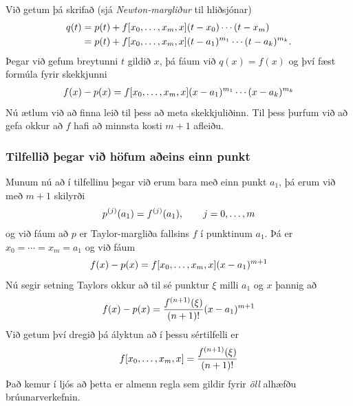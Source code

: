 \documentclass[a4paper,10pt,icelandic]{sphinxmanual}
\begin{document}
Við getum þá skrifað (sjá \emph{Newton-margliður} til hliðsjónar)
\begin{gather}
\begin{split}\begin{aligned}
  q(t) &= p(t) + f[x_0,\ldots,x_m,x](t-x_0)\cdots(t-x_m) \\
  &= p(t) + f[x_0,\ldots,x_m,x](t-a_1)^{m_1}\cdots(t-a_k)^{m_k}.\end{aligned}\end{split}\notag
\end{gather}
Þegar við gefum breytunni \(t\) gildið \(x\), þá fáum við
\(q(x) = f(x)\) og því fæst formúla fyrir skekkjunni
\begin{gather}
\begin{split}f(x) - p(x)
  = f[x_0,\ldots,x_m,x](x-a_1)^{m_1}\cdots(x-a_k)^{m_k}\end{split}\notag
\end{gather}
Nú ætlum við að finna leið til þess að meta skekkjuliðinn. Til þess
þurfum við að gefa okkur að \(f\) hafi að minnsta kosti \(m+1\)
afleiðu.


\subsubsection{Tilfellið þegar við höfum aðeins einn punkt}
\label{kafli03:tilfelli-egar-vi-hofum-aeins-einn-punkt}
Munum nú að í tilfellinu þegar við erum bara með einn punkt \(a_1\),
þá erum við með \(m+1\) skilyrði
\begin{gather}
\begin{split}p^{(j)}(a_1)=f^{(j)}(a_1), \qquad j=0,\dots,m\end{split}\notag
\end{gather}
og við fáum að \(p\) er Taylor-margliða fallsins \(f\) í
punktinum \(a_1\). Þá er \(x_0=\cdots=x_m=a_1\) og við fáum
\begin{gather}
\begin{split}f(x) - p(x)
  = f[x_0,\ldots,x_m,x](x-a_1)^{m+1}\end{split}\notag
\end{gather}
Nú segir setning Taylors okkur að til sé punktur \(\xi\) milli
\(a_1\) og \(x\) þannig að
\begin{gather}
\begin{split}f(x) - p(x)
  = \dfrac{f^{(n+1)}(\xi)}{(n+1)!}(x-a_1)^{m+1}\end{split}\notag
\end{gather}
Við getum því dregið þá ályktun að í þessu sértilfelli er
\begin{gather}
\begin{split}f[x_0,\ldots,x_m,x]=\dfrac{f^{(n+1)}(\xi)}{(n+1)!}\end{split}\notag
\end{gather}
Það kemur í ljós að þetta er almenn regla sem gildir fyrir \emph{öll}
alhæfðu brúunarverkefnin.
\end{document}
